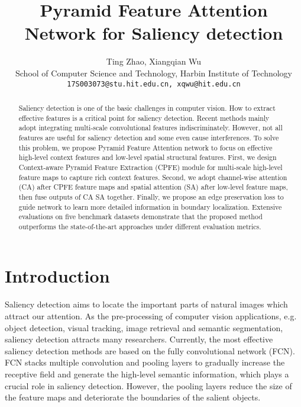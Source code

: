 \documentclass[10pt,twocolumn,letterpaper]{article}
\begin{document}
\title{Pyramid Feature Attention Network for Saliency detection}

\author{Ting Zhao, Xiangqian Wu\\
School of Computer Science and Technology, Harbin Institute of Technology \\
{\tt\small 17S003073@stu.hit.edu.cn, xqwu@hit.edu.cn\Envelope}
}

\maketitle



\begin{abstract}
Saliency detection is one of the basic challenges in computer vision. How to extract effective features is a critical point for saliency detection. Recent methods mainly adopt integrating multi-scale convolutional features indiscriminately. However, not all features are useful for saliency detection and some even cause interferences. To solve this problem, we propose Pyramid Feature Attention network to focus on effective high-level context features and low-level spatial structural features. First, we design Context-aware Pyramid Feature Extraction (CPFE) module for multi-scale high-level feature maps to capture rich context features. Second, we adopt channel-wise attention (CA) after CPFE feature maps and spatial attention (SA) after low-level feature maps, then fuse outputs of CA  SA together. Finally, we propose an edge preservation loss to guide network to learn more detailed information in boundary localization. Extensive evaluations on five benchmark datasets demonstrate that the proposed method outperforms the state-of-the-art approaches under different evaluation metrics.
\end{abstract}

\section{Introduction}

Saliency detection aims to locate the important parts of natural images which attract our attention. As the pre-processing of computer vision applications, e.g. object detection\cite{retarget1, retarget2}, visual tracking\cite{track1,track2}, image retrieval\cite{retrieval1,retrieval2} and semantic segmentation\cite{segment}, saliency detection attracts many researchers. Currently, the most effective saliency detection methods are based on the fully convolutional network (FCN). FCN stacks multiple convolution and pooling layers to gradually increase the receptive field and generate the high-level semantic information, which plays a crucial role in saliency detection. However, the pooling layers reduce the size of the feature maps and deteriorate the boundaries of the salient objects. 
\end{document}
